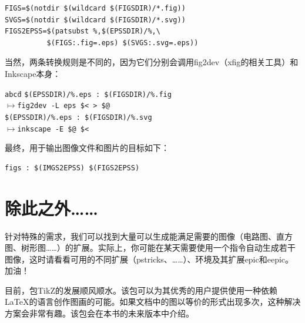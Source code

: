 \begin{mdframed}
\begin{verbatim}
FIGS=$(notdir $(wildcard $(FIGSDIR)/*.fig))
SVGS=$(notdir $(wildcard $(FIGSDIR)/*.svg))
FIGS2EPSS=$(patsubst %,$(EPSSDIR)/%,\
          $(FIGS:.fig=.eps) $(SVGS:.svg=.eps))\end{verbatim}
\end{mdframed}

当然，两条转换规则是不同的，因为它们分别会调用\textsf{fig2dev}（\textsf{xfig}的相关工具）和\textsf{Inkscape}本身：

\begin{mdframed}
\begin{tabbing}
\verb|abcd|\=\kill
\verb+$(EPSSDIR)/%.eps : $(FIGSDIR)/%.fig+\\
$\longmapsto$\>\verb+fig2dev -L eps $< > $@+\\
\verb+$(EPSSDIR)/%.eps : $(FIGSDIR)/%.svg+\\
$\longmapsto$\>\verb+inkscape -E $@ $<+
\end{tabbing}
\end{mdframed}

最终，用于输出图像文件和图片的目标如下：

\begin{mdframed}
\begin{verbatim}
figs : $(IMGS2EPSS) $(FIGS2EPSS)\end{verbatim}
\end{mdframed}

\section{除此之外……}

针对特殊的需求，我们可以找到大量可以生成能满足需要的图像（电路图、直方图、树形图……）的扩展。实际上，你可能在某天需要使用一个指令自动生成若干图像，这时请看看可用的不同扩展（\textsf{pstricks}、\MP……）、环境及其扩展\textsf{epic}和\textsf{eepic}。加油！

\begin{ii}
目前，包TikZ的发展顺风顺水。该包可以为其优秀的用户提供使用一种依赖\LaTeX 的语言创作图画的可能。如果文档中的图以等价的形式出现多次，这种解决方案会非常有趣。该包会在本书的未来版本中介绍。
\end{ii}